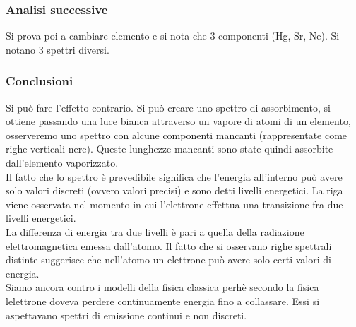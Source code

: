 \subsubsection{Analisi successive}
Si prova poi a cambiare elemento e si nota che 3 componenti (Hg, Sr, Ne). Si notano 3 spettri diversi.
\subsubsection{Conclusioni}
Si può fare l'effetto contrario. Si può creare uno spettro di assorbimento, si ottiene passando una luce bianca attraverso un vapore di atomi di un elemento, osserveremo uno spettro con alcune componenti mancanti (rappresentate come righe verticali nere). Queste lunghezze mancanti sono state quindi assorbite dall'elemento vaporizzato.\\
Il fatto che lo spettro è prevedibile significa che l'energia all'interno può avere solo valori discreti (ovvero valori precisi) e sono detti livelli energetici. La riga viene osservata nel momento in cui l'elettrone effettua una transizione fra due livelli energetici.\\
La differenza di energia tra due livelli è pari a quella della radiazione elettromagnetica emessa dall'atomo. Il fatto che si osservano righe spettrali distinte suggerisce che nell'atomo un elettrone può avere solo certi valori di energia.\\
Siamo ancora contro i modelli della fisica classica perhè secondo la fisica lelettrone doveva perdere continuamente energia fino a collassare. Essi si aspettavano spettri di emissione continui e non discreti.
